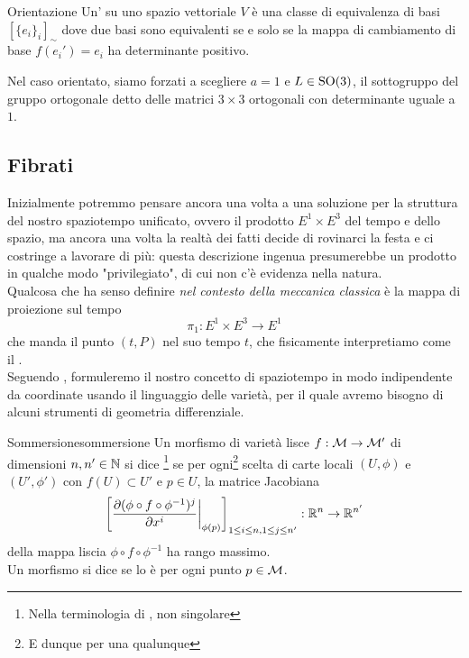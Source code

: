 \documentclass[openany]{book}
\begin{document}
\begin{definition}{Orientazione}{}
    Un' su uno spazio vettoriale $V$ è una classe di equivalenza di basi $[\{e_i\}_i]_\sim$ dove due basi sono equivalenti se e solo se la mappa di cambiamento di base $f(e_i') = e_i$ ha determinante positivo.
\end{definition}

Nel caso orientato, siamo forzati a scegliere $a=1$ e $L \in \operatorname{SO}(3)$, il sottogruppo del gruppo ortogonale detto  delle matrici $3\times 3$ ortogonali con determinante uguale a $1$.

\subsection{Fibrati}

Inizialmente potremmo pensare ancora una volta a una soluzione \naif per la struttura del nostro spaziotempo unificato, ovvero il prodotto $E^1\times E^3$ del tempo e dello spazio, ma ancora una volta la realtà dei fatti decide di rovinarci la festa e ci costringe a lavorare di più: questa descrizione ingenua presumerebbe un prodotto in qualche modo "privilegiato", di cui non c'è evidenza nella natura.\\
Qualcosa che ha senso definire \textit{nel contesto della meccanica classica} è la mappa di proiezione sul tempo 
\[\pi_1: E^1\times E^3 \to E^1\] 
che manda il punto $(t,P)$ nel suo tempo $t$, che fisicamente interpretiamo come il .\\
Seguendo \cite{Moretti2024}, formuleremo il nostro concetto di spaziotempo in modo indipendente da coordinate usando il linguaggio delle varietà, per il quale avremo bisogno di alcuni strumenti di geometria differenziale.

\begin{definition}{Sommersione}{sommersione}
    Un morfismo di varietà lisce $f:\mathcal{M}\to\mathcal{M}'$ di dimensioni $n, n' \in \mathbb{N}$ si dice \footnote{Nella terminologia di \cite{Moretti2024}, non singolare} se per ogni\footnote{E dunque per una qualunque} scelta di carte locali $(U,\phi)$ e $(U',\phi')$ con $f(U)\subset U'$ e $p\in U$, la matrice Jacobiana
    \[ \left[ \frac{\partial (\phi\circ f\circ \phi^{-1})^j  }{\partial x^i} \bigg|_{\phi(p)} \right]_{1\le i\le n, 1\le j\le n'} : \mathbb{R}^n \to \mathbb{R}^{n'}\]
    della mappa liscia $\phi\circ f\circ\phi^{-1}$ ha rango massimo.\\
    Un morfismo si dice  se lo è per ogni punto $p\in\mathcal{M}$.
\end{definition}
\end{document}
